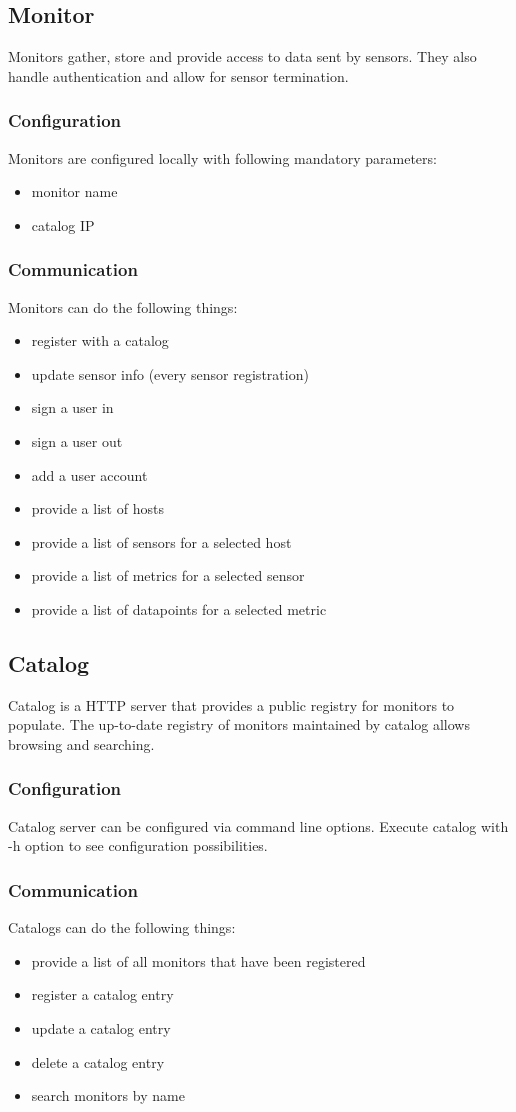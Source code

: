 \documentclass[a4paper]{article}
\begin{document}
\subsection{Monitor}
Monitors gather, store and provide access to data sent by sensors.
They also handle authentication and allow for sensor termination.
\subsubsection{Configuration}
Monitors are configured locally with following mandatory parameters:
\begin{itemize}
	\item monitor name
	\item catalog IP
\end{itemize}
\subsubsection{Communication}
Monitors can do the following things:
\begin{itemize}
	\item register with a catalog
	\item update sensor info (\@ every sensor registration)
	\item sign a user in
	\item sign a user out
	\item add a user account
	\item provide a list of hosts
	\item provide a list of sensors for a selected host
	\item provide a list of metrics for a selected sensor
	\item provide a list of datapoints for a selected metric
\end{itemize}
\subsection{Catalog}
Catalog is a HTTP server that provides a public registry for monitors to populate. The up-to-date registry of monitors maintained by catalog allows browsing and searching.
\subsubsection{Configuration}
Catalog server can be configured via command line options. Execute catalog with -h option to see configuration possibilities.
\subsubsection{Communication}
Catalogs can do the following things:
\begin{itemize}
	\item provide a list of all monitors that have been registered
	\item register a catalog entry
	\item update a catalog entry
	\item delete a catalog entry
	\item search monitors by name
\end{itemize}
\end{document}
